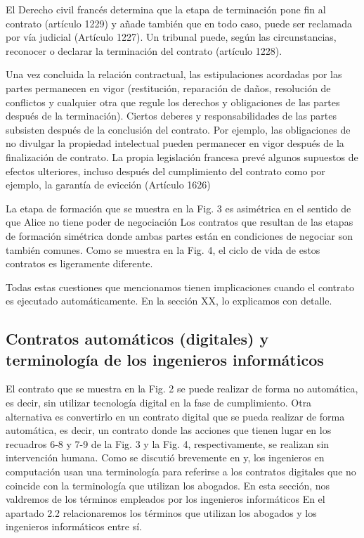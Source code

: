 \documentclass[12pt]{report} %
\begin{document}
\begin{itemize}
El Derecho civil francés determina que la etapa de terminación pone fin al contrato (artículo 1229) y añade también que en todo caso, puede ser reclamada por vía judicial (Artículo 1227). Un tribunal puede, según las circunstancias, reconocer o declarar la terminación del contrato (artículo 1228). 

Una vez concluida la relación contractual, las estipulaciones acordadas por las partes permanecen en vigor (restitución, reparación de daños, resolución de conflictos y cualquier otra que regule los derechos y obligaciones de las partes después de la terminación). Ciertos deberes y responsabilidades de las partes subsisten después de la conclusión del contrato. Por ejemplo, las obligaciones de no divulgar la propiedad intelectual pueden permanecer en vigor después de la finalización de contrato. La propia legislación francesa prevé algunos supuestos de efectos ulteriores, incluso después del cumplimiento del contrato como por ejemplo, la garantía de evicción (Artículo 1626)

La etapa de formación que se muestra en la Fig. 3 es asimétrica en el sentido de que Alice no tiene poder de negociación Los contratos que resultan de las etapas de formación simétrica donde ambas partes están en condiciones de negociar son también comunes. Como se muestra en la Fig. 4, el ciclo de vida de estos contratos es ligeramente diferente. 

Todas estas cuestiones que mencionamos tienen implicaciones cuando el contrato es ejecutado automáticamente. En la sección XX, lo explicamos con detalle.

\subsection{Contratos automáticos (digitales) y terminología de los ingenieros informáticos}

El contrato que se muestra en la Fig. 2 se puede realizar de forma no automática, es decir, sin utilizar tecnología digital en la fase de cumplimiento. Otra alternativa es convertirlo en un contrato digital que se pueda realizar de forma automática, es decir, un contrato donde  las acciones que tienen lugar en los recuadros 6-8 y 7-9 de la Fig. 3 y la Fig. 4, respectivamente, se realizan sin intervención humana. Como se discutió brevemente en\cite{Christopher2019} y\cite{Monika2019},  los ingenieros en computación usan una terminología para referirse a los contratos digitales que no coincide con la terminología que utilizan los abogados. En esta sección, nos valdremos de los términos empleados por los ingenieros informáticos En el apartado 2.2 relacionaremos los términos que utilizan los abogados y los ingenieros informáticos entre sí.


\end{itemize}
\end{document}
